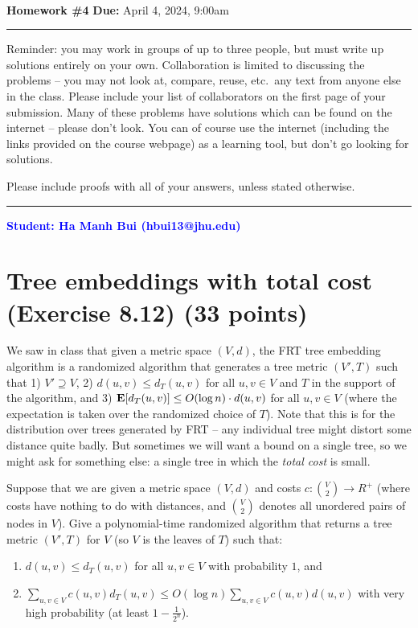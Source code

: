 \documentclass[11pt]{article}
\newcommand{\expct}[1]{\ensuremath{\text{{\bf E}$\left[#1\right]$}}}
\begin{document}
\\
{{\bf Homework \#4}} \hfill {{\bf Due:} April 4, 2024, 9:00am} \\
\rule[0.1in]{\textwidth}{0.4pt}

Reminder: you may work in groups of up to three people, but must write up solutions entirely on your own.  Collaboration is limited to discussing the problems -- you may not look at, compare, reuse, etc.~any text from anyone else in the class.  Please include your list of collaborators on the first page of your submission.  Many of these problems have solutions which can be found on the internet -- please don't look.  You can of course use the internet (including the links provided on the course webpage) as a learning tool, but don't go looking for solutions.  

Please include proofs with all of your answers, unless stated otherwise.

\noindent \rule[0.1in]{\textwidth}{0.4pt}

\begin{center}
    \textbf{\textcolor{blue}{Student: Ha Manh Bui (hbui13@jhu.edu)}}
\end{center}

\section{Tree embeddings with total cost (Exercise 8.12) (33 points)}

We saw in class that given a metric space $(V, d)$, the FRT tree embedding algorithm is a randomized algorithm that generates a tree metric $(V', T)$ such that 1) $V' \supseteq V$, 2) $d(u,v) \leq d_T(u,v)$ for all $u,v \in V$ and $T$ in the support of the algorithm, and 3) $\expct{d_T(u,v)} \leq O(\log n) \cdot d(u,v)$ for all $u,v \in V$ (where the expectation is taken over the randomized choice of $T$).  Note that this is for the distribution over trees generated by FRT -- any individual tree might distort some distance quite badly.  But sometimes we will want a bound on a single tree, so we might ask for something else: a single tree in which the \emph{total cost} is small.

Suppose that we are given a metric space $(V,d)$ and costs $c : {V \choose 2} \rightarrow R^+$ (where costs have nothing to do with distances, and ${V \choose 2}$ denotes all unordered pairs of nodes in $V$).  Give a polynomial-time randomized algorithm that returns a tree metric $(V', T)$ for $V$ (so $V$ is the leaves of $T$) such that: 
\begin{enumerate}[label=\arabic*)]
\item $d(u,v) \leq d_T(u,v)$ for all $u,v \in V$ with probability $1$, and 
\item  $\sum_{u,v \in V} c(u,v) d_T(u,v) \leq O(\log n)  \sum_{u,v \in V} c(u,v) d(u,v)$ with very high probability (at least $1 - \frac{1}{2^n}$).  
\end{enumerate}
\end{document}
